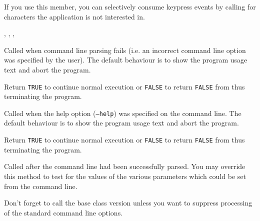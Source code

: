 If you use this member, you can selectively consume keypress events by calling\rtfsp
{} for characters the application is not interested in.


, ,\rtfsp
{}, 

\label{wxapponcmdlineerror}


Called when command line parsing fails (i.e. an incorrect command line option
was specified by the user). The default behaviour is to show the program usage
text and abort the program.

Return {\tt TRUE} to continue normal execution or {\tt FALSE} to return 
{\tt FALSE} from  thus terminating the program.



\label{wxapponcmdlinehelp}


Called when the help option ({\tt --help}) was specified on the command line.
The default behaviour is to show the program usage text and abort the program.

Return {\tt TRUE} to continue normal execution or {\tt FALSE} to return 
{\tt FALSE} from  thus terminating the program.



\label{wxapponcmdlineparsed}


Called after the command line had been successfully parsed. You may override
this method to test for the values of the various parameters which could be
set from the command line.

Don't forget to call the base class version unless you want to suppress
processing of the standard command line options.

